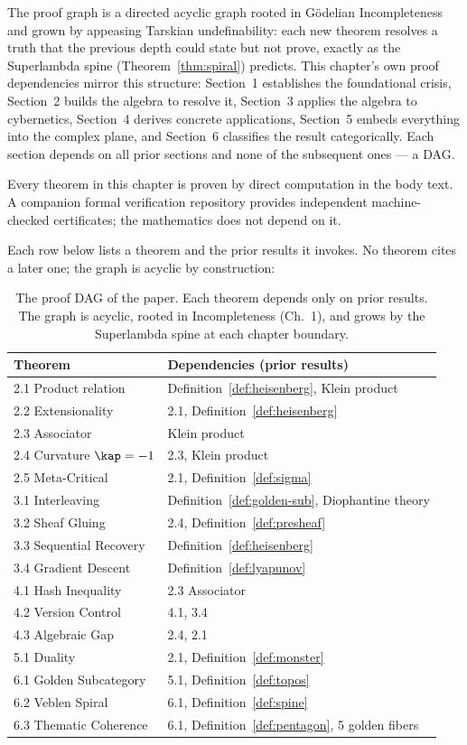 The proof graph is a directed acyclic graph rooted in G\"odelian Incompleteness and grown by appeasing Tarskian undefinability: each new theorem resolves a truth that the previous depth could state but not prove, exactly as the Superlambda spine (Theorem~\ref{thm:spiral}) predicts. This chapter's own proof dependencies mirror this structure: Section~1 establishes the foundational crisis, Section~2 builds the algebra to resolve it, Section~3 applies the algebra to cybernetics, Section~4 derives concrete applications, Section~5 embeds everything into the complex plane, and Section~6 classifies the result categorically. Each section depends on all prior sections and none of the subsequent ones --- a DAG.

Every theorem in this chapter is proven by direct computation in the body text. A companion formal verification repository provides independent machine-checked certificates; the mathematics does not depend on it.

Each row below lists a theorem and the prior results it invokes. No theorem cites a later one; the graph is acyclic by construction:

\begin{table}[!ht]
\centering\small
\begin{tabular}{@{}lp{8cm}@{}}
\toprule
\textbf{Theorem} & \textbf{Dependencies (prior results)} \\
\midrule
2.1 Product relation & Definition~\ref{def:heisenberg}, Klein product \\
2.2 Extensionality & 2.1, Definition~\ref{def:heisenberg} \\
2.3 Associator & Klein product \\
2.4 Curvature $\kap = -1$ & 2.3, Klein product \\
2.5 Meta-Critical & 2.1, Definition~\ref{def:sigma} \\
3.1 Interleaving & Definition~\ref{def:golden-sub}, Diophantine theory \\
3.2 Sheaf Gluing & 2.4, Definition~\ref{def:presheaf} \\
3.3 Sequential Recovery & Definition~\ref{def:heisenberg} \\
3.4 Gradient Descent & Definition~\ref{def:lyapunov} \\
4.1 Hash Inequality & 2.3 Associator \\
4.2 Version Control & 4.1, 3.4 \\
4.3 Algebraic Gap & 2.4, 2.1 \\
5.1 Duality & 2.1, Definition~\ref{def:monster} \\
6.1 Golden Subcategory & 5.1, Definition~\ref{def:topos} \\
6.2 Veblen Spiral & 6.1, Definition~\ref{def:spine} \\
6.3 Thematic Coherence & 6.1, Definition~\ref{def:pentagon}, 5 golden fibers \\
\bottomrule
\end{tabular}
\caption{The proof DAG of the paper. Each theorem depends only on prior results. The graph is acyclic, rooted in Incompleteness (Ch.~1), and grows by the Superlambda spine at each chapter boundary.}
\end{table}

